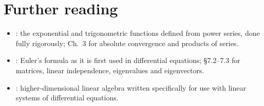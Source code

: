 \section{Further reading}\label{sec:ch00-reading}

\begin{itemize}
  \item \textcite[Ch.~8]{Rudin}: the exponential and trigonometric functions
        defined from power series, done fully rigorously; Ch.~3 for absolute
        convergence and products of series.
  \item \textcite[\S3.3]{BoyceDiPrima}: Euler's formula as it is first used in
        differential equations; \S7.2--7.3 for matrices, linear independence,
        eigenvalues and eigenvectors.
  \item \textcite[Ch.~5]{HSD}: higher-dimensional linear algebra written
        specifically for use with linear systems of differential equations.
\end{itemize}
